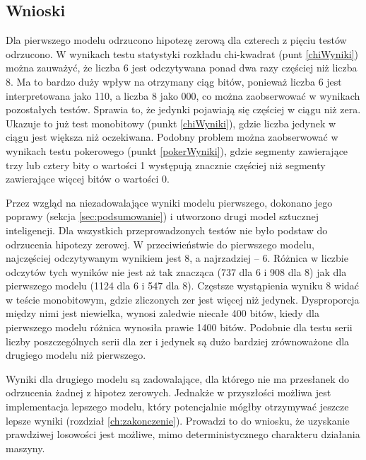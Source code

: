 \subsection{Wnioski}
Dla pierwszego modelu odrzucono hipotezę zerową dla czterech z pięciu testów odrzucono. W wynikach testu statystyki 
rozkładu chi-kwadrat (punt \ref{chiWyniki}) można zauważyć, że liczba 6 jest odczytywana ponad dwa razy częściej niż 
liczba 8. Ma to bardzo duży wpływ na otrzymany ciąg bitów, ponieważ liczba 6 jest interpretowana jako 110, a 
liczba 8 jako 000, co można zaobserwować w wynikach pozostałych testów. Sprawia to, że jedynki pojawiają się 
częściej w ciągu niż zera. Ukazuje to już test monobitowy (punkt \ref{chiWyniki}), gdzie liczba jedynek w ciągu jest 
większa niż oczekiwana. Podobny problem można zaobserwować w wynikach testu pokerowego (punkt \ref{pokerWyniki}), 
gdzie segmenty zawierające trzy lub cztery bity o wartości 1 występują znacznie częściej niż segmenty zawierające 
więcej bitów o wartości 0. 
\par
Przez wzgląd na niezadowalające wyniki modelu pierwszego, dokonano jego poprawy (sekcja \ref{sec:podsumowanie}) i
utworzono drugi model sztucznej inteligencji. Dla wszystkich przeprowadzonych testów nie było podstaw do odrzucenia
hipotezy zerowej. W przeciwieństwie do pierwszego modelu, najczęściej odczytywanym wynikiem jest 8, a najrzadziej -- 6.
Różnica w liczbie odczytów tych wyników nie jest aż tak znacząca (737 dla 6 i 908 dla 8) jak dla pierwszego modelu 
(1124 dla 6 i 547 dla 8). Częstsze wystąpienia wyniku 8 widać w teście monobitowym, gdzie zliczonych zer jest więcej
niż jedynek. Dysproporcja między nimi jest niewielka, wynosi zaledwie niecałe 400 bitów, kiedy dla pierwszego modelu
różnica wynosiła prawie 1400 bitów. Podobnie dla testu serii liczby poszczególnych serii dla zer i jedynek są dużo
bardziej zrównoważone dla drugiego modelu niż pierwszego.
\par
Wyniki dla drugiego modelu są zadowalające, dla którego nie ma przesłanek do odrzucenia żadnej z hipotez zerowych.
Jednakże w przyszłości możliwa jest implementacja lepszego modelu, który
potencjalnie mógłby otrzymywać jeszcze lepsze wyniki (rozdział \ref{ch:zakonczenie}). Prowadzi to do wniosku, że uzyskanie prawdziwej 
losowości jest możliwe, mimo deterministycznego charakteru działania maszyny.

